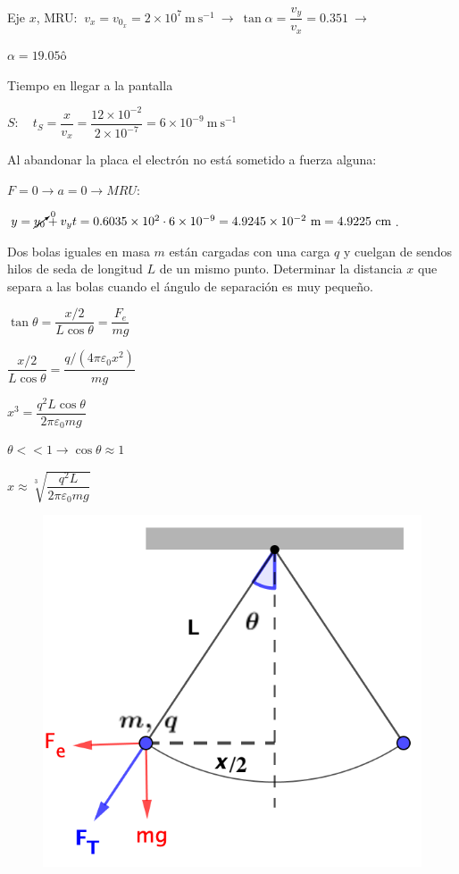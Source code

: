 Eje $x$, MRU: $\ v_x=v_{0_x}=2\times 10^7\ \mathrm{m\  s}^{-1} \ \to \ \tan \alpha=\dfrac{v_y}{v_x}=0.351 \ \to \ $

$\alpha=19.05ô$

Tiempo en llegar a la pantalla 

$S: \quad t_S=\dfrac{x}{v_x}=\dfrac{12\times 10^{-2}}{2\times 10^{-7}}=6\times 10^{-9} \ \mathrm{m\ s}^{-1}$ 

Al abandonar la placa el electrón no está sometido a fuerza alguna: 

$F=0\to a=0 \to MRU: \quad $

$y=\cancelto{0}{y_0}+v_y t=0.6035\times 10^2 \cdot 6 \times 10^{-9}=4.9245\times 10^{-2} \ \mathrm{m}=4.9225 \ \mathrm{cm}$.

\begin{prob}
Dos bolas iguales en masa $m$ están cargadas con una carga $q$ y cuelgan de sendos hilos de seda de longitud $L$ de un mismo punto. Determinar la distancia $x$ que separa a las bolas cuando el ángulo de separación es muy pequeño.	
\end{prob}

\begin{multicols}{2}
$\tan \theta=\dfrac{x/2}{L\cos \theta}=\dfrac{F_e}{mg}$

$\dfrac{x/2}{L\cos \theta}=\dfrac{q/(4\pi \varepsilon_0 x^2)}{mg}$

$x^3=\dfrac{q^2L\cos \theta}{2\pi \varepsilon_0 m g}$

$\theta << 1 \to \cos \theta \approx 1$

$x\approx \sqrt[3]{\dfrac{q^2L}{2\pi \varepsilon_0 m g}}$
\begin{figure}[H]
	\centering
	\includegraphics[width=.4\textwidth]{imagenes/imagenes22/T22IM18.png}
\end{figure}	
\end{multicols}


